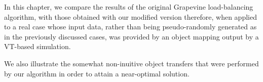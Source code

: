 In this chapter, we compare the results of the original Grapevine load-balancing algorithm,
with those obtained with our modified version therefore, when applied to a real
case whose input data, rather than being pseudo-randomly generated as in the previously
discussed cases, was provided by an object mapping output by a VT-based simulation.

We also illustrate the somewhat non-inuitive object transfers that were performed by our
algorithm in order to attain a near-optimal solution. 
